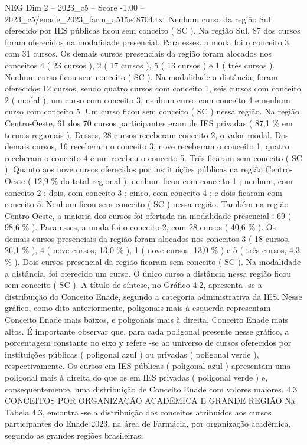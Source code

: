\begin{textsample}{NEG Dim 2 – 2023\_c5 – Score -1.00 – 2023\_c5/enade\_2023\_farm\_a515e48704.txt}
Nenhum curso da região Sul oferecido por IES públicas ficou sem conceito ( SC ).
Na região Sul, 87 dos cursos foram oferecidos na modalidade presencial.
Para esses, a moda foi o conceito 3, com 31 cursos.
Os demais cursos presenciais da região foram alocados nos conceitos 4 ( 23 cursos ), 2 ( 17 cursos ), 5 ( 13 cursos ) e 1 ( três cursos ).
Nenhum curso ficou sem conceito ( SC ).
Na modalidade a distância, foram oferecidos 12 cursos, sendo quatro cursos com conceito 1, seis cursos com conceito 2 ( modal ), um curso com conceito 3, nenhum curso com conceito 4 e nenhum curso com conceito 5.
Um curso ficou sem conceito ( SC ) nessa região.
Na região Centro-Oeste, 61 dos 70 cursos participantes eram de IES privadas ( 87,1 \% em termos regionais ).
Desses, 28 cursos receberam conceito 2, o valor modal.
Dos demais cursos, 16 receberam o conceito 3, nove receberam o conceito 1, quatro receberam o conceito 4 e um recebeu o conceito 5.
Três ficaram sem conceito ( SC ).
Quanto aos nove cursos oferecidos por instituições públicas na região Centro-Oeste ( 12,9 \% do total regional ), nenhum ficou com conceito 1 ; nenhum, com conceito 2 ; dois, com conceito 3 ; cinco, com conceito 4 ; e dois ficaram com conceito 5.
Nenhum ficou sem conceito ( SC ) nessa região.
Também na região Centro-Oeste, a maioria dos cursos foi ofertada na modalidade presencial : 69 ( 98,6 \% ).
Para esses, a moda foi o conceito 2, com 28 cursos ( 40,6 \% ).
Os demais cursos presenciais da região foram alocados nos conceitos 3 ( 18 cursos, 26,1 \% ), 4 ( nove cursos, 13,0 \% ), 1 ( nove cursos, 13,0 \% ) e 5 ( três cursos, 4,3 \% ).
Dois cursos presencial da região ficaram sem conceito ( SC ).
Na modalidade a distância, foi oferecido um curso.
O único curso a distância nessa região ficou sem conceito ( SC ).
A título de síntese, no Gráfico 4.2, apresenta -se a distribuição do Conceito Enade, segundo a categoria administrativa da IES.
Nesse gráfico, como dito anteriormente, poligonais mais à esquerda representam Conceito Enade mais baixos, e poligonais mais à direita, Conceito Enade mais altos.
É importante observar que, para cada poligonal presente nesse gráfico, a porcentagem constante no eixo y refere -se ao universo de cursos oferecidos por instituições públicas ( poligonal azul ) ou privadas ( poligonal verde ), respectivamente.
Os cursos em IES públicas ( poligonal azul ) apresentam uma poligonal mais à direita do que os em IES privadas ( poligonal verde ) e, consequentemente, uma distribuição de Conceito Enade com valores maiores. 4.3 CONCEITOS POR ORGANIZAÇÃO ACADÊMICA E GRANDE REGIÃO Na Tabela 4.3, encontra -se a distribuição dos conceitos atribuídos aos cursos participantes do Enade 2023, na área de Farmácia, por organização acadêmica, segundo as grandes regiões brasileiras.

\end{textsample}
